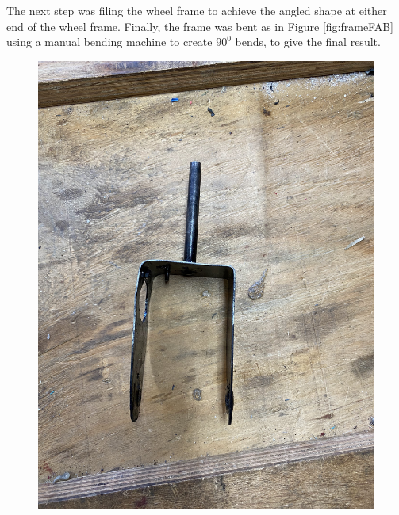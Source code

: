 \par
The next step was filing the wheel frame to achieve the angled shape at either end of the wheel frame. Finally, the frame was bent as in Figure \ref{fig:frameFAB} using a manual bending machine to create $90^0$ bends, to give the final result.

\begin{figure}[H]
    \centering
    \includegraphics[scale = 0.07]{Figures/wheelFRAMEempty1.jpg}

\end{figure}
